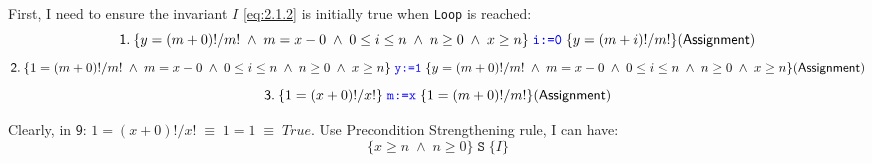 First, I need to ensure the invariant \(I\) \eqref{eq:2.1.2} is initially true when \texttt{Loop} is reached:
\begin{equation*}
\mathsf{1.}\: \{y=(m+0)!/m!\;\land\;m=x-0\;\land\;0 \leq i \leq n\;\land\;n \geq 0\;\land\;x \geq n\}\;\texttt{\textcolor{blue}{i:=0}}\;\{y=(m+i)!/m!\} \mathsf{(Assignment)}
\end{equation*}
\begin{equation*}
\mathsf{2.}\: \{1=(m+0)!/m!\;\land\;m=x-0\;\land\;0 \leq i \leq n\;\land\;n \geq 0\;\land\;x \geq n\}\;\texttt{\textcolor{blue}{y:=1}}\;\{y=(m+0)!/m!\;\land\;m=x-0\;\land\;0 \leq i \leq n\;\land\;n \geq 0\;\land\;x \geq n\} \mathsf{(Assignment)}
\end{equation*}
\begin{equation*}
\mathsf{3.}\: \{1=(x+0)!/x!\}\;\texttt{\textcolor{blue}{m:=x}}\;\{1=(m+0)!/m!\} \mathsf{(Assignment)}
\end{equation*}



Clearly, in \(\mathsf{9}\): \(1=(x+0)!/x!\; \equiv\; 1=1\; \equiv\; True\). Use Precondition Strengthening rule, I can have:
\begin{equation}
\label{eq:2.2.1}
\{x \geq n\;\wedge\; n \geq 0\}\; \texttt{S}\; \{I\}
\end{equation}

